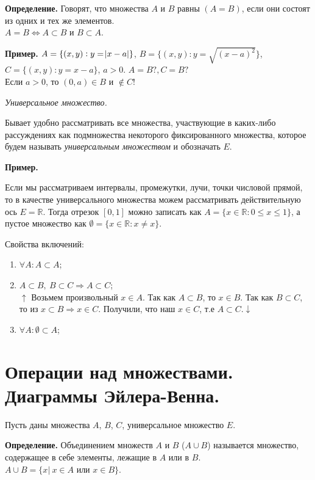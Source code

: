 \documentclass{article}
\begin{document}
    \textbf{Определение.} Говорят, что множества $A$ и $B$ равны $(A = B)$, если они состоят из одних и тех же элементов.\\
    $A = B \Leftrightarrow A \subset B$ и $B \subset A$.

    \textbf{Пример.}
	$A = \{(x, y): y = \abs{x-a}\}$, $B = \{(x, y): y = \sqrt{(x - a)^2}\}$, $C = \{(x, y): y = x - a\}$, $a > 0$. $A = B ?, C = B ?$\\ 
    Если $a > 0$, то $(0, a) \in B$ и $\not\in C!$

    \textit{Универсальное множество.}
    
    Бывает удобно рассматривать все множества, участвующие в каких-либо рассуждениях как подмножества некоторого фиксированного множества, которое будем называть \textit{универсальным множеством} и обозначать $E$.
    
    \textbf{Пример.}

    Если мы рассматриваем интервалы, промежутки, лучи, точки числовой прямой, то в качестве универсального множества можем рассматривать действительную ось $E = \mathbb{R}$. Тогда отрезок $[0, 1]$ можно записать как $A = \{ x \in \mathbb{R}: 0 \leq x \leq 1 \}$, а пустое множество как $\emptyset = \{x \in \mathbb{R}: x \neq x\}$.

    Свойства включений:

    \begin{enumerate}
        \item $\forall A: A \subset A$;
        \item $A \subset B,\ B \subset C \Rightarrow A \subset C$;\\
        $\uparrow$ Возьмем произвольный $x \in A$. Так как $A \subset B$, то $x \in B$. Так как $B \subset C$, то из $x \subset B \Rightarrow x \in C$. Получили, что наш $x \in C$, т.е $A \subset C. \downarrow$
        \item $\forall A: \emptyset \subset A$; 
    \end{enumerate} 

    \section{Операции над множествами. Диаграммы Эйлера-Венна.}

    Пусть даны множества $A$, $B$, $C$, универсальное множество $E$. 

    \textbf{Определение.} Объединением множеств $A$ и $B$ ($A \cup B$) называется множество, содержащее в себе элементы, лежащие в $A$ или в $B$. $A \cup B = \{x|\ x \in A \textrm{ или } x \in B\}$. 
\end{document}
